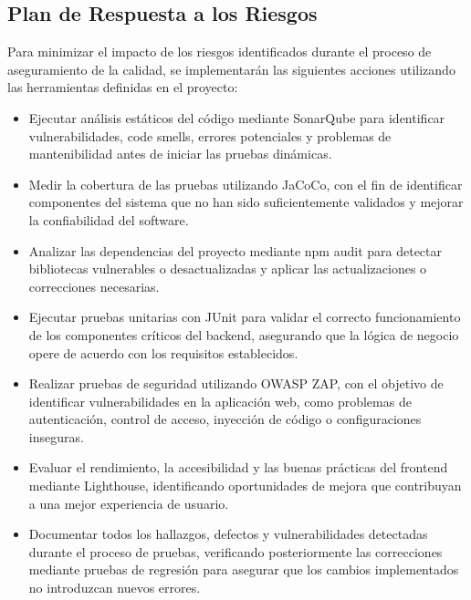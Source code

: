 \subsection*{Plan de Respuesta a los Riesgos}
Para minimizar el impacto de los riesgos identificados durante el proceso de aseguramiento de la calidad, se implementarán las siguientes acciones utilizando las herramientas definidas en el proyecto:
\begin{itemize}
    \item Ejecutar análisis estáticos del código mediante SonarQube para identificar vulnerabilidades, code smells, errores potenciales y problemas de mantenibilidad antes de iniciar las pruebas dinámicas.
    \item Medir la cobertura de las pruebas utilizando JaCoCo, con el fin de identificar componentes del sistema que no han sido suficientemente validados y mejorar la confiabilidad del software.
    \item Analizar las dependencias del proyecto mediante npm audit para detectar bibliotecas vulnerables o desactualizadas y aplicar las actualizaciones o correcciones necesarias.
    \item Ejecutar pruebas unitarias con JUnit para validar el correcto funcionamiento de los componentes críticos del backend, asegurando que la lógica de negocio opere de acuerdo con los requisitos establecidos.
    \item Realizar pruebas de seguridad utilizando OWASP ZAP, con el objetivo de identificar vulnerabilidades en la aplicación web, como problemas de autenticación, control de acceso, inyección de código o configuraciones inseguras.
    \item Evaluar el rendimiento, la accesibilidad y las buenas prácticas del frontend mediante Lighthouse, identificando oportunidades de mejora que contribuyan a una mejor experiencia de usuario.
    \item Documentar todos los hallazgos, defectos y vulnerabilidades detectadas durante el proceso de pruebas, verificando posteriormente las correcciones mediante pruebas de regresión para asegurar que los cambios implementados no introduzcan nuevos errores.
\end{itemize}